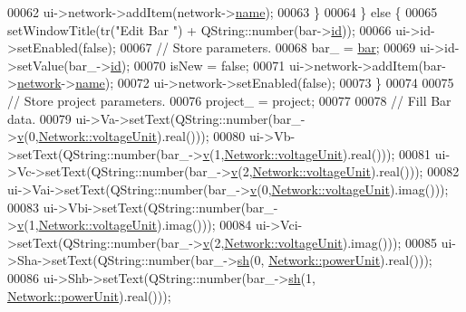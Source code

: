 \begin{DoxyCode}
00062       ui->network->addItem(network->\hyperlink{class_network_ab6643733a517f930c60b06f5ffd78186}{name});
00063     \}
00064   \} \textcolor{keywordflow}{else} \{
00065     setWindowTitle(tr(\textcolor{stringliteral}{"Edit Bar "}) + QString::number(bar->\hyperlink{class_bar_a9dc5c6a6d44fe412ae34ef8a881b8dce}{id}));
00066     ui->id->setEnabled(\textcolor{keyword}{false});
00067     \textcolor{comment}{// Store parameters.}
00068     bar\_ = \hyperlink{class_bar_properties_a65d09e7315764cd4ad33b5a0ded32090}{bar};
00069     ui->id->setValue(bar\_->\hyperlink{class_bar_a9dc5c6a6d44fe412ae34ef8a881b8dce}{id});
00070     isNew = \textcolor{keyword}{false};
00071     ui->network->addItem(bar->\hyperlink{class_bar_a80025f13884750add58cc61b318357ff}{network}->\hyperlink{class_network_ab6643733a517f930c60b06f5ffd78186}{name});
00072     ui->network->setEnabled(\textcolor{keyword}{false});
00073   \}
00074 
00075 \textcolor{comment}{// Store project parameters.}
00076   project\_ = project;
00077 
00078 \textcolor{comment}{// Fill Bar data.}
00079   ui->Va->setText(QString::number(bar\_->\hyperlink{group___models_ga1e6f2daec86407118656d88170d1adc2}{v}(0,\hyperlink{group___graphics_gacde031ef95f5c05565ee35769f2ed89e}{Network::voltageUnit}).real()));
00080   ui->Vb->setText(QString::number(bar\_->\hyperlink{group___models_ga1e6f2daec86407118656d88170d1adc2}{v}(1,\hyperlink{group___graphics_gacde031ef95f5c05565ee35769f2ed89e}{Network::voltageUnit}).real()));
00081   ui->Vc->setText(QString::number(bar\_->\hyperlink{group___models_ga1e6f2daec86407118656d88170d1adc2}{v}(2,\hyperlink{group___graphics_gacde031ef95f5c05565ee35769f2ed89e}{Network::voltageUnit}).real()));
00082   ui->Vai->setText(QString::number(bar\_->\hyperlink{group___models_ga1e6f2daec86407118656d88170d1adc2}{v}(0,\hyperlink{group___graphics_gacde031ef95f5c05565ee35769f2ed89e}{Network::voltageUnit}).imag()));
00083   ui->Vbi->setText(QString::number(bar\_->\hyperlink{group___models_ga1e6f2daec86407118656d88170d1adc2}{v}(1,\hyperlink{group___graphics_gacde031ef95f5c05565ee35769f2ed89e}{Network::voltageUnit}).imag()));
00084   ui->Vci->setText(QString::number(bar\_->\hyperlink{group___models_ga1e6f2daec86407118656d88170d1adc2}{v}(2,\hyperlink{group___graphics_gacde031ef95f5c05565ee35769f2ed89e}{Network::voltageUnit}).imag()));
00085   ui->Sha->setText(QString::number(bar\_->\hyperlink{group___models_gac188071bf5f165b0acdaa4c8af82355c}{sh}(0, \hyperlink{group___graphics_ga9504015bc566f4a3d3b4d4a86000293b}{Network::powerUnit}).real()));
00086   ui->Shb->setText(QString::number(bar\_->\hyperlink{group___models_gac188071bf5f165b0acdaa4c8af82355c}{sh}(1, \hyperlink{group___graphics_ga9504015bc566f4a3d3b4d4a86000293b}{Network::powerUnit}).real()));

\end{DoxyCode}
